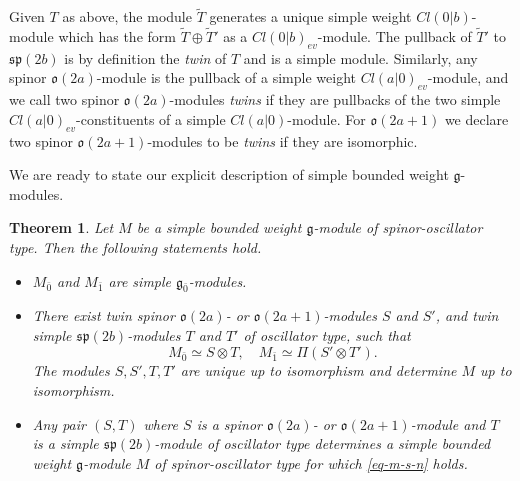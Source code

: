 \documentclass[12pt]{amsart}
\theoremstyle{plain} %
\numberwithin{equation}{section}
\theoremstyle{definition}
\theoremstyle{remark}
\theoremstyle{plain} %
\newtheorem{theorem}[definition]{Theorem}
\renewcommand{\gg}{\mathfrak{g}}
\renewcommand{\sp}{\mathfrak{sp}}
\newcommand{\so}{\mathfrak{o}}
\def\gg{\mathfrak{g}}
\begin{document}
	 
	 Given $T$ as above, the module $\tilde T$ generates a unique simple weight $Cl(0|b)$-module which has the form $\tilde T \oplus \tilde T'$ as a $Cl(0|b)_{ev}$-module. The pullback of $\tilde T'$ to $\sp(2b)$ is by definition the \emph{twin} of $T$ and is a simple module.  Similarly, any spinor $\so(2a)$-module is the pullback of a simple weight $Cl(a|0)_{ev}$-module, and 
	 we call two  spinor $\so(2a)$-modules {\emph{twins}} if they are  pullbacks of the two simple $Cl(a|0)_{ev}$-constituents of a simple $Cl(a|0)$-module. For $\so(2a+1)$ we declare two  spinor $\so(2a+1)$-modules  to be {\emph{twins}} if they are isomorphic. 

 We are ready to state our explicit description of  simple bounded weight $\gg$-modules. 
 	 
	 \begin{theorem}  \label{thm-m-twins} Let $M$ be a simple bounded weight $\gg$-module of spinor-oscillator type. Then the following statements hold.
	 \begin{itemize}
\item[(a)]	$M_{\bar{0}}$ and  $M_{\bar{1}}$ are simple $\gg_{\bar{0}}$-modules.
\item[(b)]	There exist twin spinor $\so(2a)$- or $\so(2a+1)$-modules $S$ and $S'$, and twin simple  $\sp(2b)$-modules $T$ and $T'$ of oscillator type, such that 
                      \begin{equation} \label{eq-m-s-n}
                      M_{\bar{0}}\simeq S\otimes T,\quad M_{\bar{1}}\simeq \Pi (S'\otimes T').
                      \end{equation}
                      The modules $S,S',T,T'$ are unique up to isomorphism and determine $M$ up to isomorphism.
\item[(c)] Any pair $(S,T)$ where  $S$ is a  spinor $\so(2a)$- or $\so(2a+1)$-module and $T$ is a simple  $\sp(2b)$-module of oscillator type determines a simple bounded weight $\gg$-module $M$ of spinor-oscillator type for which \eqref{eq-m-s-n} holds. 
	 \end{itemize}	 
	 \end{theorem}
\end{document}
